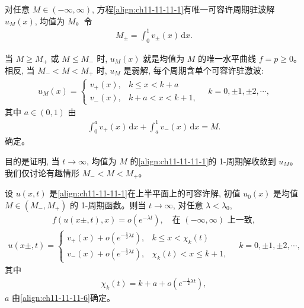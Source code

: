 \documentclass[../../main.tex]{subfiles}
\begin{document}
对任意 $M\in(-\infty,\infty)$, 方程\eqref{align:ch11-11-11-1}有唯一可容许周期驻波解 $u_M(x)$, 均值为 $M$。令
\begin{align}
M_\pm=\int_0^1 v_\pm(x)\,\mathrm{d}x.\label{align:ch11-11-11-4}
\end{align}

当 $M\geqslant M_+$ 或 $M\leqslant M_-$ 时, $u_M(x)$ 就是均值为 $M$ 的唯一水平曲线 $f=p\geqslant0$。相反, 当 $M_-<M<M_+$ 时, $u_M$ 是弱解, 每个周期含单个可容许驻激波:
\begin{align}
u_M(x)=
\begin{cases}
v_+(x), & k\leqslant x<k+a\\
v_-(x), & k+a<x<k+1,
\end{cases}\quad k=0,\pm1,\pm2,\cdots,\label{align:ch11-11-11-5}
\end{align}
其中 $a\in(0,1)$ 由
\begin{align}
\int_0^a v_+(x)\,\mathrm{d}x+\int_a^1 v_-(x)\,\mathrm{d}x=M.\label{align:ch11-11-11-6}
\end{align}
确定。

目的是证明, 当 $t\to\infty$, 均值为 $M$ 的\eqref{align:ch11-11-11-1}的 1-周期解收敛到 $u_M$。我们仅讨论有趣情形 $M_-<M<M_+$。

\begin{theorem}\label{theorem:ch11-11-11-1}
设 $u(x,t)$ 是\eqref{align:ch11-11-11-1}在上半平面上的可容许解, 初值 $u_0(x)$ 是均值 $M\in(M_-,M_+)$ 的 1-周期函数。则当 $t\to\infty$, 对任意 $\lambda<\lambda_0$,
\begin{align}
f(u(x\pm,t),x)=o\left(e^{-\lambda t}\right),\quad \text{在 }(-\infty,\infty)\text{ 上一致},\label{align:ch11-11-11-7}
\end{align}
\begin{align}
u(x\pm,t)=
\begin{cases}
v_+(x)+o\left(e^{-\frac12\lambda t}\right), & k\leqslant x<\chi_k(t)\\
v_-(x)+o\left(e^{-\frac12\lambda t}\right), & \chi_k(t)<x\leqslant k+1,
\end{cases}\quad k=0,\pm1,\pm2,\cdots,\label{align:ch11-11-11-8}
\end{align}
其中
\begin{align}
\chi_k(t)=k+a+o\left(e^{-\frac12\lambda t}\right),\label{align:ch11-11-11-9}
\end{align}
$a$ 由\eqref{align:ch11-11-11-6}确定。
\end{theorem}
\end{document}
